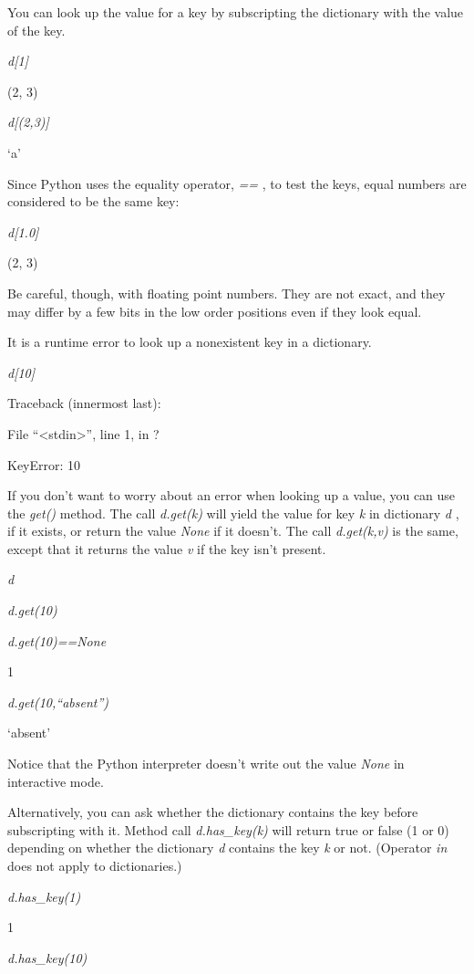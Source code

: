 You can look up the value for a key
by subscripting the dictionary with the value of the key.


\emph{d{[}1{]}}

(2, 3)


\emph{d{[}(2,3){]}}

`a'

Since Python uses the equality
operator, \emph{==} , to test the keys, equal numbers are considered to
be the same key:


\emph{d{[}1.0{]}}

(2, 3)

Be careful, though, with floating
point numbers. They are not exact, and they may differ by a few bits in
the low order positions even if they look equal.

It is a runtime error to look up a
nonexistent key in a dictionary.


\emph{d{[}10{]}}

Traceback (innermost last):

 File
``\textless{}stdin\textgreater{}'', line 1, in ?

KeyError: 10

If you don't want to worry about an
error when looking up a value, you can use the \emph{get()} method. The
call \emph{d.get(k)} will yield the value for key \emph{k} in dictionary
\emph{d} , if it exists, or return the value \emph{None} if it doesn't.
The call \emph{d.get(k,v)} is the same, except that it returns the value
\emph{v} if the key isn't present.


\emph{d}




\emph{d.get(10)}


\emph{d.get(10)==None}

1


\emph{d.get(10,``absent'')}

`absent'

Notice that the Python interpreter
doesn't write out the value \emph{None} in interactive mode.

Alternatively, you can ask whether
the dictionary contains the key before subscripting with it. Method call
\emph{d.has\_key(k)} will return true or false (1 or 0) depending on
whether the dictionary \emph{d} contains the key \emph{k} or not.
(Operator \emph{in} does not apply to dictionaries.)


\emph{d.has\_key(1)}

1


\emph{d.has\_key(10)}

